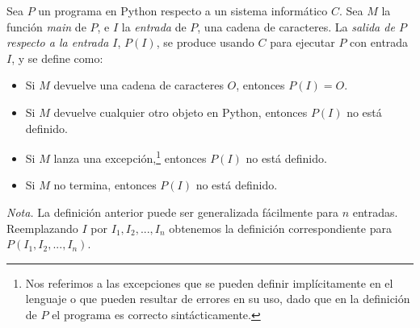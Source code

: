 \begin{definicion}\label{def:salida-programa}
Sea $P$ un programa en Python respecto a un sistema informático $C$. Sea $M$ la función \emph{main} de $P$, e $I$ la \emph{entrada} de $P$, una cadena de caracteres. La \emph{salida de $P$ respecto a la entrada $I$}, $P(I)$, se produce usando $C$ para ejecutar $P$ con entrada $I$, y se define como:

\begin{itemize}
    \item Si $M$ devuelve una cadena de caracteres $O$, entonces $P(I)=O$.
    \item Si $M$ devuelve cualquier otro objeto en Python, entonces $P(I)$ no está definido.
    \item Si $M$ lanza una excepción,\footnote{Nos referimos a las excepciones que se pueden definir implícitamente en el lenguaje o que pueden resultar de errores en su uso, dado que en la definición de $P$ el programa es correcto sintácticamente.} entonces $P(I)$ no está definido.
    \item Si $M$ no termina, entonces $P(I)$ no está definido.
\end{itemize}

\emph{Nota.} La definición anterior puede ser generalizada fácilmente para $n$ entradas. Reemplazando $I$ por $I_1, I_2, ..., I_n$ obtenemos la definición correspondiente para $P(I_1, I_2, ..., I_n)$.
\end{definicion}





